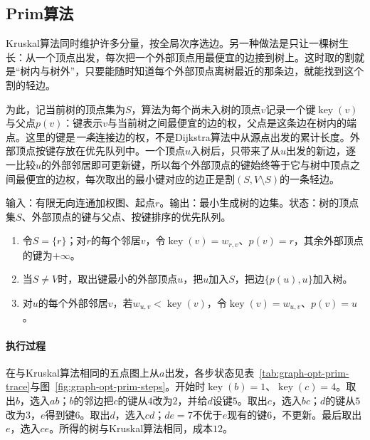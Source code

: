 \subsection{Prim算法}
\label{sec:graph-opt-prim}

Kruskal算法同时维护许多分量，按全局次序选边。另一种做法是只让一棵树生长：从一个顶点出发，每次把一个外部顶点用最便宜的边接到树上。这时取的割就是“树内与树外”，只要能随时知道每个外部顶点离树最近的那条边，就能找到这个割的轻边。

为此，记当前树的顶点集为$S$，算法为每个尚未入树的顶点$v$记录一个键$\operatorname{key}(v)$与父点$p(v)$：键表示$v$与当前树之间最便宜的边的权，父点是这条边在树内的端点。这里的键是\emph{一条}连接边的权，不是Dijkstra算法中从源点出发的累计长度。外部顶点按键存放在优先队列中。一个顶点$u$入树后，只带来了从$u$出发的新边，逐一比较$u$的外部邻居即可更新键，所以每个外部顶点的键始终等于它与树中顶点之间最便宜的边权，每次取出的最小键对应的边正是割$(S,V\setminus S)$的一条轻边。

\begin{algorithm}[Prim算法]
\label{alg:graph-opt-prim}
输入：有限无向连通加权图、起点$r$。输出：最小生成树的边集。状态：树的顶点集$S$、外部顶点的键与父点、按键排序的优先队列。
\begin{enumerate}
  \item 令$S=\{r\}$；对$r$的每个邻居$v$，令$\operatorname{key}(v)=w_{r,v}$、$p(v)=r$，其余外部顶点的键为$+\infty$。
  \item 当$S\neq V$时，取出键最小的外部顶点$u$，把$u$加入$S$，把边$\{p(u),u\}$加入树。
  \item 对$u$的每个外部邻居$v$，若$w_{u,v}<\operatorname{key}(v)$，令$\operatorname{key}(v)=w_{u,v}$、$p(v)=u$。
\end{enumerate}
\end{algorithm}

\paragraph{执行过程}
在与Kruskal算法相同的五点图上从$a$出发，各步状态见表~\ref{tab:graph-opt-prim-trace}与图~\ref{fig:graph-opt-prim-steps}。开始时$\operatorname{key}(b)=1$、$\operatorname{key}(c)=4$。取出$b$，选入$ab$；$b$的邻边把$c$的键从$4$改为$2$，并给$d$设键$5$。取出$c$，选入$bc$；$d$的键从$5$改为$3$，$e$得到键$6$。取出$d$，选入$cd$；$de=7$不优于$e$现有的键$6$，不更新。最后取出$e$，选入$ce$。所得的树与Kruskal算法相同，成本$12$。

